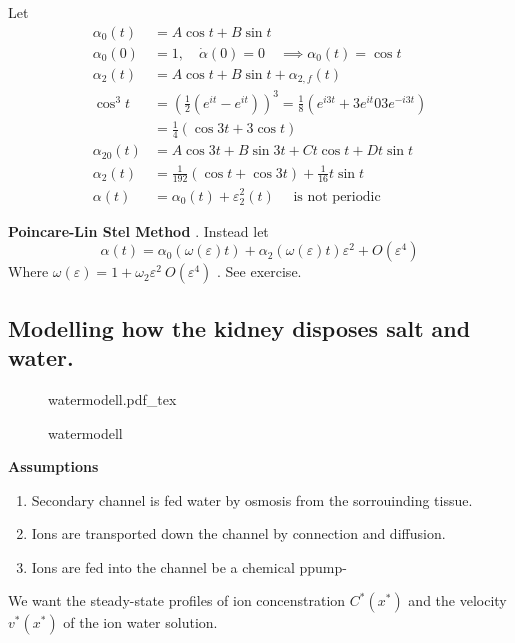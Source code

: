 \documentclass{article}
\newcommand{\incfig}[2][1]{%
\def\svgwidth{#1\columnwidth}
{#2.pdf_tex} } \pdfsuppresswarningpagegroup=1
\theoremstyle{remark}
\begin{document}
Let \[
  \begin{split}
\alpha _{0} \left( t \right)  & = A\cos t + B \sin t \\
\alpha _{0} \left( 0 \right)  &  = 1 , \quad  \dot{\alpha } \left( 0 \right) = 0 \quad  \implies  \alpha _{0} \left( t \right) = \cos t   \\
\alpha _{2} \left( t \right) &=  A \cos t + B \sin  t + \alpha _{2, f} \left( t \right)  \\
\cos ^3 t  & = \left( \frac{1}{2} \left( e^{it} - e^{it} \right) \right)^3 = \frac{1}{8} \left( e^{i3t} + 3e^{it} 0 3 e^{-i3t} \right) \\
&= \frac{1}{4} \left( \cos 3t + 3\cos t \right) \\
  \alpha _{20} \left( t \right) &=  A \cos3t + B \sin 3t + Ct \cos t + Dt \sin t \\
  \alpha _{2}\left( t \right) &=  \frac{1}{192} \left( \cos t + \cos 3t \right) +\frac{1}{16} t \sin t \\
  \alpha \left( t \right)  & = \alpha _{0} \left( t \right) + \varepsilon ^2 _{2} \left( t \right) \quad  \text{ is not periodic}  
  \end{split} 
\] 

\begin{tcolorbox}
  \textbf{Poincare-Lin Stel Method} .
Instead let \[
\alpha \left( t \right) = \alpha _{0} \left( \omega \left( \varepsilon  \right)t \right) + \alpha _{2} \left( \omega \left( \varepsilon  \right)t \right)\varepsilon ^2 + O\left( \varepsilon ^{4} \right)
\] 
Where $\omega \left( \varepsilon  \right)  = 1 + \omega _{2} \varepsilon ^2 \ O\left( \varepsilon ^{4} \right)$ . See exercise.
\end{tcolorbox}

\subsection{Modelling how the kidney disposes salt and water.}%
\label{sub:modelling_how_the_kidney_disposes_salt_and_water_}



\begin{figure}[ht]
    \centering
    \incfig{watermodell}
    \caption{watermodell}
    \label{fig:watermodell}
\end{figure}


\textbf{Assumptions}  
\begin{enumerate}
  \item Secondary channel is fed water by osmosis from the sorrouinding tissue.
  \item Ions are transported down the channel by connection and diffusion.
  \item Ions are fed into the channel be a chemical ppump-
\end{enumerate}
We want the steady-state profiles of ion concenstration $C^{*} \left( x^{*} \right) $ and the velocity $v^{*} \left( x^{*} \right) $ of the ion water solution.
\end{document}
